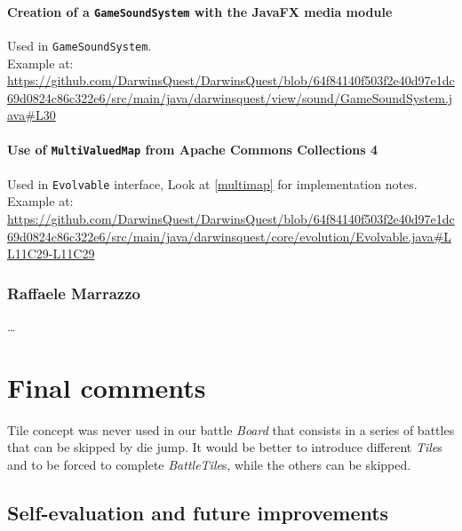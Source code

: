 \documentclass[12pt, a4paper]{report}
\theoremstyle{definition}
\begin{document}

    \subsubsection{Creation of a \texttt{GameSoundSystem} with the JavaFX media module}
    Used in \verb|GameSoundSystem|.\\
    Example at: \url{https://github.com/DarwinsQuest/DarwinsQuest/blob/64f84140f503f2e40d97e1dc69d0824c86c322e6/src/main/java/darwinsquest/view/sound/GameSoundSystem.java#L30}

    \subsubsection{Use of \texttt{MultiValuedMap} from Apache Commons Collections 4}
    Used in \verb|Evolvable| interface, Look at \ref{multimap} for implementation notes.\\
    Example at: \url{https://github.com/DarwinsQuest/DarwinsQuest/blob/64f84140f503f2e40d97e1dc69d0824c86c322e6/src/main/java/darwinsquest/core/evolution/Evolvable.java#LL11C29-L11C29}

    \subsection*{Raffaele Marrazzo}

    \dots

\chapter{Final comments}

    Tile concept was never used in our battle \emph{Board} that consists in a series of battles that can be skipped by die jump.
    It would be better to introduce different \emph{Tile}s and to be forced to complete \emph{BattleTile}s, while the others can be skipped.

\section{Self-evaluation and future improvements}
\end{document}
